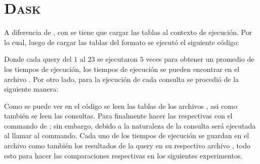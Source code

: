\section*{\scshape\textbf{Dask}}

  A diferencia de , con  se tiene que cargar las tablas
  al contexto de ejecución. Por lo cual, luego de cargar las tablas del formato
   se ejecutó el siguiente código:

  
  Donde cada query del $1$ al $23$ se ejecutaron $5$ veces para obtener un
  promedio de los tiempos de ejecución, los tiempos de ejecución se pueden
  encontrar en el archivo . Por otro lado, para
  la ejecución de cada consulta se procedió de la siguiente manera:


  Como se puede ver en el código  se leen las tablas de los archivos
  , asi como también se leen las consultas. Para finalmente hacer
  las  respectivas con el commando  de ; sin embargo, debido
  a la naturaleza de  la consulta será ejecutada al llamar al commando.
  Cada uno de los tiempos de ejecución se guardan en el archivo  como también
  los resultados de la query en su respectivo archivo , todo esto para
  hacer las comparaciones respectivas en los siguientes experimentos.
